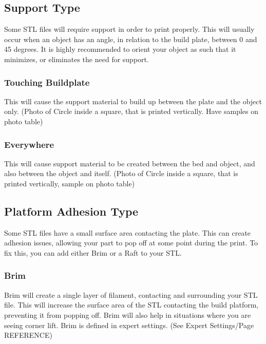 \subsection{Support Type}

Some STL files will require support in order to print properly. This will usually occur when an object has an angle, in relation to the build plate, between 0 and 45 degrees. It is highly recommended to orient your object as such that it minimizes, or eliminates the need for support.

\subsubsection{Touching Buildplate}

This will cause the support material to build up between the plate and the object only. (Photo of Circle inside a square, that is printed vertically. Have samples on photo table)

\subsubsection{Everywhere}

This will cause support material to be created between the bed and object, and also between the object and itself. (Photo of Circle inside a square, that is printed vertically, sample on photo table)

\subsection{Platform Adhesion Type}

Some STL files have a small surface area contacting the plate. This can create adhesion issues, allowing your part to pop off at some point during the print. To fix this, you can add either Brim or a Raft to your STL.

\subsubsection{Brim}

Brim will create a single layer of filament, contacting and surrounding your STL file. This will increase the surface area of the STL contacting the build platform, preventing it from popping off. Brim will also help in situations where you are seeing corner lift. Brim is defined in expert settings. (See Expert Settings/Page REFERENCE)

